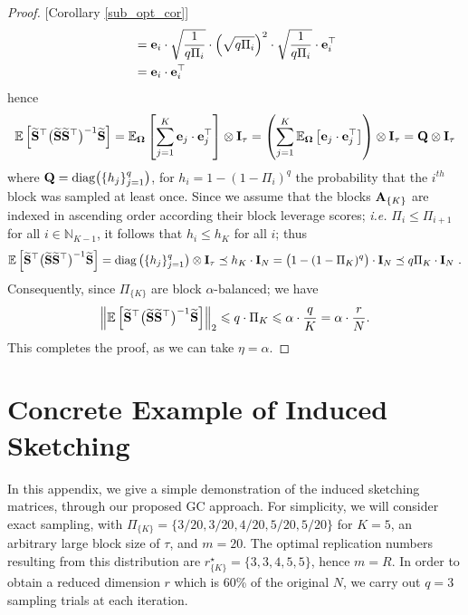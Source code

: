 \documentclass[journal,letterpaper,onecolumn,twoside,nofonttune]{IEEEtran}
\newcommand{\N}{\mathbb{N}}
\newcommand{\E}{\mathbb{E}}
\newcommand{\eb}{\bold{e}}
\newcommand{\Ab}{\bold{A}}
\newcommand{\Ib}{\bold{I}}
\newcommand{\Qb}{\bold{Q}}
\newcommand{\Sb}{\bold{S}}
\newcommand{\Sbwt}{\widetilde{\Sb}}
\newcommand{\Omb}{\bold{\Omega}}
\newcommand{\diag}{\mathrm{diag}}
\begin{document}
\begin{proof}{[Corollary \ref{sub_opt_cor}]}
\begin{align*}
  &= \eb_i\cdot\sqrt{\frac{1}{q\Pi_i}}\cdot\left(\sqrt{q\Pi_i}\right)^2\cdot\sqrt{\frac{1}{q\Pi_i}}\cdot\eb_i^\top \\
  &= \eb_i\cdot\eb_i^\top
\end{align*}
hence
\begin{equation*}
  \E\left[\Sbwt^\top\big(\Sbwt\Sbwt^\top\big)^{-1}\Sbwt\right] = \E_\Omb\left[\sum_{j=1}^K\eb_j\cdot\eb_j^\top\right]\otimes\Ib_\tau = \left(\sum_{j=1}^K\E_\Omb\left[\eb_j\cdot\eb_j^\top\right]\right)\otimes\Ib_\tau = \Qb\otimes\Ib_\tau
\end{equation*}
where $\Qb=\diag\big(\{h_j\}_{j=1}^q\big)$, for $h_i=1-(1-\Pi_i)^q$ the probability that the $i^{th}$ block was sampled at least once. Since we assume that the blocks $\Ab_{\{K\}}$ are indexed in ascending order according their block leverage scores; \textit{i.e.} $\Pi_i\leqslant\Pi_{i+1}$ for all $i\in\N_{K-1}$, it follows that $h_i\leqslant h_K$ for all $i$; thus%
\begin{equation*}
  \E\left[\Sbwt^\top\big(\Sbwt\Sbwt^\top\big)^{-1}\Sbwt\right] = \diag\left(\{h_j\}_{j=1}^q\right)\otimes\Ib_\tau \preceq h_K\cdot\Ib_N = \big(1-(1-\Pi_K)^q\big)\cdot\Ib_N \preceq q\Pi_K\cdot\Ib_N\ .
\end{equation*}
Consequently, since $\Pi_{\{K\}}$ are block $\alpha$-balanced; we have
\begin{equation*}
  \left\|\E\left[\Sbwt^\top\big(\Sbwt\Sbwt^\top\big)^{-1}\Sbwt\right]\right\|_2 \leqslant q\cdot\Pi_K \leqslant \alpha\cdot\frac{q}{K} = \alpha\cdot\frac{r}{N} .
\end{equation*}
This completes the proof, as we can take $\eta=\alpha$.
\end{proof}

\section{Concrete Example of Induced Sketching}
\label{app_example}

In this appendix, we give a simple demonstration of the induced sketching matrices, through our proposed GC approach. For simplicity, we will consider exact sampling, with $\Pi_{\{K\}}=\{3/20,3/20,4/20,5/20,5/20\}$ for $K=5$, an arbitrary large block size of $\tau$, and $m=20$. The optimal replication numbers resulting from this distribution are $r^{\star}_{\{K\}}=\{3,3,4,5,5\}$, hence $m=R$. In order to obtain a reduced dimension $r$ which is 60\% of the original $N$, we carry out $q=3$ sampling trials at each iteration.
\end{document}
